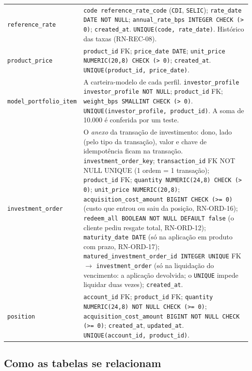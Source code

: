 \documentclass[11pt,a4paper]{article}
\newcommand{\tb}[1]{\texttt{#1}}           %
\begin{document}
\begin{longtable}{@{}P{3.9cm}P{12.2cm}@{}}
\tb{reference_rate} & \tb{code reference_rate_code} (\tb{CDI}, \tb{SELIC}); \tb{rate_date DATE NOT NULL}; \tb{annual_rate_bps INTEGER CHECK (> 0)}; \tb{created_at}. \tb{UNIQUE(code, rate_date)}. Histórico das taxas (RN-REC-08). \\
\tb{product_price} & \tb{product_id} FK; \tb{price_date DATE}; \tb{unit_price NUMERIC(20,8) CHECK (> 0)}; \tb{created_at}. \tb{UNIQUE(product_id, price_date)}. \\
\tb{model_portfolio_item} & A carteira-modelo de cada perfil. \tb{investor_profile investor_profile NOT NULL}; \tb{product_id} FK; \tb{weight_bps SMALLINT CHECK (> 0)}. \tb{UNIQUE(investor_profile, product_id)}. A soma de 10.000 é conferida por um teste. \\
\tb{investment_order} & O \emph{anexo} da transação de investimento: dono, lado (pelo tipo da transação), valor e chave de idempotência ficam na transação. \tb{investment_order_key}; \tb{transaction_id} FK NOT NULL UNIQUE (1 ordem = 1 transação); \tb{product_id} FK; \tb{quantity NUMERIC(24,8) CHECK (> 0)}; \tb{unit_price NUMERIC(20,8)}; \tb{acquisition_cost_amount BIGINT CHECK (>= 0)} (custo que entrou ou saiu da posição, RN-ORD-16); \tb{redeem_all BOOLEAN NOT NULL DEFAULT false} (o cliente pediu resgate total, RN-ORD-12); \tb{maturity_date DATE} (só na aplicação em produto com prazo, RN-ORD-17); \tb{matured_investment_order_id INTEGER UNIQUE} FK $\to$ \tb{investment_order} (só na liquidação do vencimento: a aplicação devolvida; o \tb{UNIQUE} impede liquidar duas vezes); \tb{created_at}. \\
\tb{position} & \tb{account_id} FK; \tb{product_id} FK; \tb{quantity NUMERIC(24,8) NOT NULL CHECK (>= 0)}; \tb{acquisition_cost_amount BIGINT NOT NULL CHECK (>= 0)}; \tb{created_at}, \tb{updated_at}. \tb{UNIQUE(account_id, product_id)}. \\
\bottomrule
\end{longtable}

\subsection{Como as tabelas se relacionam}
\end{document}
